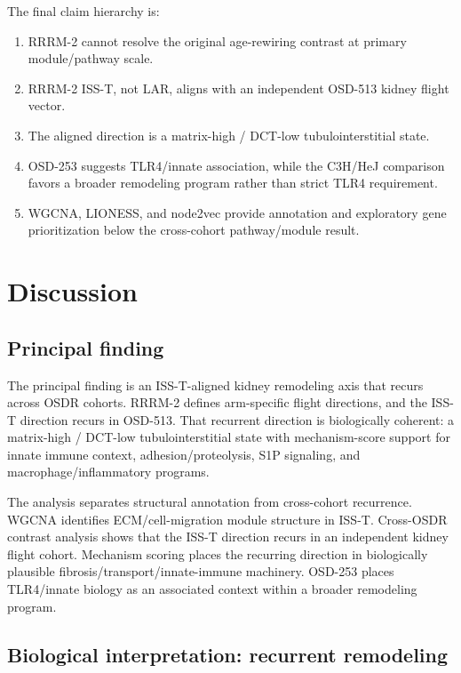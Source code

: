 \documentclass[11pt]{article}
\begin{document}
The final claim hierarchy is:
\begin{enumerate}
  \item RRRM-2 cannot resolve the original age-rewiring contrast at primary module/pathway scale.
  \item RRRM-2 ISS-T, not LAR, aligns with an independent OSD-513 kidney flight vector.
  \item The aligned direction is a matrix-high / DCT-low tubulointerstitial state.
  \item OSD-253 suggests TLR4/innate association, while the C3H/HeJ comparison favors a broader remodeling program rather than strict TLR4 requirement.
  \item WGCNA, LIONESS, and node2vec provide annotation and exploratory gene prioritization below the cross-cohort pathway/module result.
\end{enumerate}

\section{Discussion}

\subsection{Principal finding}

The principal finding is an ISS-T-aligned kidney remodeling axis that recurs across OSDR cohorts. RRRM-2 defines arm-specific flight directions, and the ISS-T direction recurs in OSD-513. That recurrent direction is biologically coherent: a matrix-high / DCT-low tubulointerstitial state with mechanism-score support for innate immune context, adhesion/proteolysis, S1P signaling, and macrophage/inflammatory programs.

The analysis separates structural annotation from cross-cohort recurrence. WGCNA identifies ECM/cell-migration module structure in ISS-T. Cross-OSDR contrast analysis shows that the ISS-T direction recurs in an independent kidney flight cohort. Mechanism scoring places the recurring direction in biologically plausible fibrosis/transport/innate-immune machinery. OSD-253 places TLR4/innate biology as an associated context within a broader remodeling program.

\subsection{Biological interpretation: recurrent remodeling}
\end{document}
